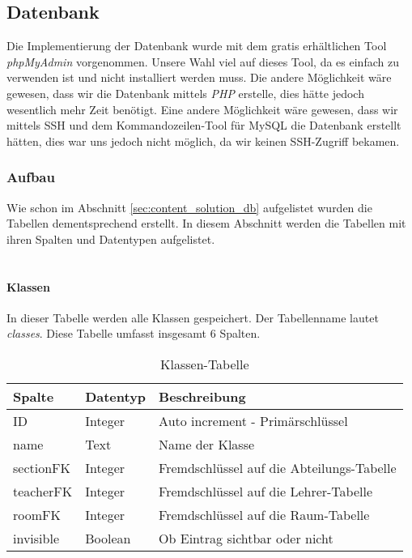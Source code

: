 \subsection{Datenbank}
Die Implementierung der Datenbank wurde mit dem gratis erhältlichen Tool \textit{phpMyAdmin} vorgenommen. Unsere Wahl viel auf dieses Tool, da es einfach zu verwenden ist und nicht installiert werden muss. Die andere Möglichkeit wäre gewesen, dass wir die Datenbank mittels \textit{PHP} erstelle, dies hätte jedoch wesentlich mehr Zeit benötigt. Eine andere Möglichkeit wäre gewesen, dass wir mittels SSH und dem Kommandozeilen-Tool für MySQL die Datenbank erstellt hätten, dies war uns jedoch nicht möglich, da wir keinen SSH-Zugriff bekamen.
\subsubsection{Aufbau}
%
Wie schon im Abschnitt \autoref{sec:content_solution_db} aufgelistet wurden die Tabellen dementsprechend erstellt. In diesem Abschnitt werden die Tabellen mit ihren Spalten und Datentypen aufgelistet.\\
\\
\paragraph{Klassen\\}
In dieser Tabelle werden alle Klassen gespeichert. Der Tabellenname lautet \textit{classes}. Diese Tabelle umfasst insgesamt 6 Spalten.
\begin{table}[H]
\centering
\begin{tabular}{p{2.5 cm}p{2.5 cm}p{10 cm}}
   \toprule
   \textbf{Spalte} & \textbf{Datentyp} & \textbf{Beschreibung} \\
   \midrule
          ID & Integer & Auto increment - Primärschlüssel  \\
          \hline
          name & Text & Name der Klasse \\
          \hline
          sectionFK & Integer & Fremdschlüssel auf die Abteilungs-Tabelle \\
          \hline
          teacherFK & Integer & Fremdschlüssel auf die Lehrer-Tabelle\\
          \hline
          roomFK & Integer & Fremdschlüssel auf die Raum-Tabelle\\
          \hline
          invisible & Boolean & Ob Eintrag sichtbar oder nicht\\
   \bottomrule
\end{tabular}
\caption{Klassen-Tabelle}
\end{table}

